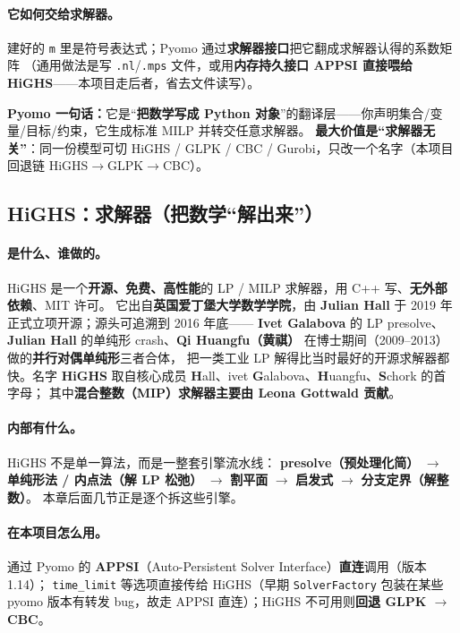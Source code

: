 \documentclass[11pt]{ctexart}
\newcommand{\code}[1]{\texttt{#1}}
\begin{document}
\paragraph{它如何交给求解器。}建好的 \code{m} 里是符号表达式；Pyomo 通过\textbf{求解器接口}把它翻成求解器认得的系数矩阵
（通用做法是写 \code{.nl}/\code{.mps} 文件，或用\textbf{内存持久接口 APPSI 直接喂给 HiGHS}——本项目走后者，省去文件读写）。
\begin{key}\textbf{Pyomo 一句话：}它是“\textbf{把数学写成 Python 对象}”的翻译层——你声明集合/变量/目标/约束，它生成标准 MILP 并转交任意求解器。
\textbf{最大价值是“求解器无关”}：同一份模型可切 HiGHS / GLPK / CBC / Gurobi，只改一个名字（本项目回退链 HiGHS$\to$GLPK$\to$CBC）。
\end{key}

\subsection{HiGHS：求解器（把数学“解出来”）}
\paragraph{是什么、谁做的。}HiGHS 是一个\textbf{开源、免费、高性能}的 LP / MILP 求解器，用 C++ 写、\textbf{无外部依赖}、MIT 许可。
它出自\textbf{英国爱丁堡大学数学学院}，由 \textbf{Julian Hall} 于 2019 年正式立项开源；源头可追溯到 2016 年底——
\textbf{Ivet Galabova} 的 LP presolve、\textbf{Julian Hall} 的单纯形 crash、\textbf{Qi Huangfu（黄祺）} 在博士期间（2009--2013）做的\textbf{并行对偶单纯形}三者合体，
把一类工业 LP 解得比当时最好的开源求解器都快。名字 \textbf{HiGHS} 取自核心成员 \textbf{H}all、ivet \textbf{G}alabova、\textbf{H}uangfu、\textbf{S}chork 的首字母；
其中\textbf{混合整数（MIP）求解器主要由 Leona Gottwald 贡献}。
\paragraph{内部有什么。}HiGHS 不是单一算法，而是一整套引擎流水线：
\textbf{presolve（预处理化简）} $\to$ \textbf{单纯形法 / 内点法（解 LP 松弛）} $\to$ \textbf{割平面} $\to$ \textbf{启发式} $\to$ \textbf{分支定界（解整数）}。
本章后面几节正是逐个拆这些引擎。
\paragraph{在本项目怎么用。}通过 Pyomo 的 \textbf{APPSI}（Auto-Persistent Solver Interface）\textbf{直连}调用（版本 1.14）；
\code{time\_limit} 等选项直接传给 HiGHS（早期 \code{SolverFactory} 包装在某些 pyomo 版本有转发 bug，故走 APPSI 直连）；HiGHS 不可用则\textbf{回退 GLPK $\to$ CBC}。
\end{document}
